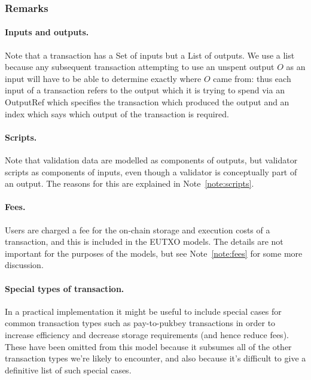 \documentclass[a4paper]{article}
\newcounter{note}
\newcommand{\todompj}[1]{\todo[inline,color=yellow!40,author=Michael]{#1}}
\newcommand{\s}{\textsf}  %
\begin{document}
\subsubsection{Remarks}
\paragraph{Inputs and outputs. } Note that a transaction has a
\textsf{Set} of inputs but a \textsf{List} of outputs. We use a list
because any subsequent transaction attempting to use an unspent output
$O$ as an input will have to be able to determine exactly where $O$
came from: thus each input of a transaction refers to the output which
it is trying to spend via an \s{OutputRef} which specifies the
transaction which produced the output and an index which says which
output of the transaction is required.


\paragraph{Scripts.} Note that validation data are modelled as components
of outputs, but validator scripts as components of inputs, even though
a validator is conceptually part of an output.  The reasons for this
are explained in Note~\ref{note:scripts}.

\paragraph{Fees.}  Users are charged a fee for the on-chain storage
and execution costs of a transaction, and this is included in the
EUTXO models.  The details are not important for the purposes of the
models, but see Note~\ref{note:fees} for some more discussion.

\paragraph{Special types of transaction.} In a practical
implementation it might be useful to include special cases for common
transaction types such as pay-to-pukbey transactions in order to
increase efficiency and decrease storage requirements (and hence
reduce fees).  These have been omitted from this model because it
subsumes all of the other transaction types we're likely to encounter,
and also because it's difficult to give a definitive list of such
special cases.
\end{document}

